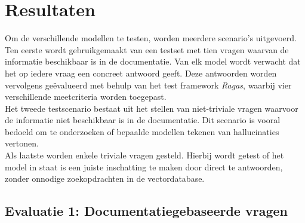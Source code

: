 
\chapter{Resultaten}
\label{ch:resultaten}







Om de verschillende modellen te testen, worden meerdere scenario’s uitgevoerd.
Ten eerste wordt gebruikgemaakt van een testset met tien vragen waarvan de informatie beschikbaar is in de documentatie. Van elk model wordt verwacht dat het op iedere vraag een concreet antwoord geeft. Deze antwoorden worden vervolgens geëvalueerd met behulp van het test framework \textit{Ragas}, waarbij vier verschillende meetcriteria worden toegepast.
\\[1em]
Het tweede testscenario bestaat uit het stellen van niet-triviale vragen waarvoor de informatie niet beschikbaar is in de documentatie. Dit scenario is vooral bedoeld om te onderzoeken of bepaalde modellen tekenen van hallucinaties vertonen.
\\[1em]
Als laatste worden enkele triviale vragen gesteld. Hierbij wordt getest of het model in staat is een juiste inschatting te maken door direct te antwoorden, zonder onnodige zoekopdrachten in de vectordatabase.

\section{Evaluatie 1: Documentatiegebaseerde vragen}

